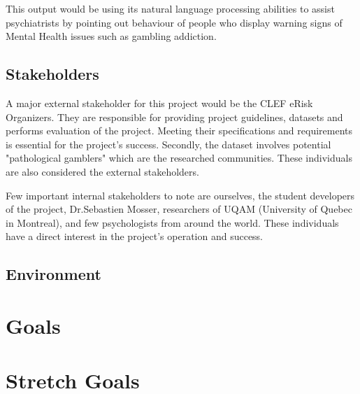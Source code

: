 \documentclass{article}
\begin{document}
This output would be using its natural language processing abilities to assist psychiatrists by pointing out behaviour of people who display warning signs of Mental Health issues such as gambling addiction.

\subsection{Stakeholders}
A major external stakeholder for this project would be the CLEF eRisk Organizers. They are responsible for providing project guidelines, datasets and performs evaluation of the project. Meeting their specifications and requirements is essential for the project's success. Secondly, the dataset involves potential "pathological gamblers" which are the researched communities. These individuals are also considered the external stakeholders.

Few important internal stakeholders to note are ourselves, the student developers of the project, Dr.Sebastien Mosser, researchers of UQAM (University of Quebec in Montreal), and few psychologists from around the world. These individuals have a direct interest in the project's operation and success.

\subsection{Environment}


\section{Goals}

\section{Stretch Goals}
\end{document}
